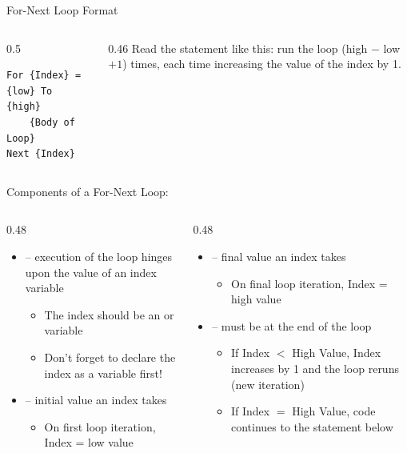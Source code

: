 \documentclass{beamer}
\begin{document}
{%
\begin{frame}[fragile]{For-Next Loop Format}
\begin{columns}[c]
\begin{column}{0.5\textwidth}
\begin{lstlisting}[language=VBA]
For {Index} = {low} To {high}
    {Body of Loop}
Next {Index}
\end{lstlisting}
\end{column}
\begin{column}{0.46\textwidth}
\small Read the statement like this: run the loop (high $-$ low $+ 1$) times, each time
increasing the value of the index by 1.
\end{column}
\end{columns}
\vspace{0.2em}
\scriptsize
Components of a For-Next Loop:
\begin{columns}[T]
\begin{column}{0.48\textwidth}
\begin{itemize}
  \item {} -- execution of the loop hinges upon the value of an index variable
  \begin{itemize}
    \item The index should be an  or  variable
    \item Don't forget to declare the index as a variable first!
  \end{itemize}
  \item {} -- initial value an index takes
  \begin{itemize}\item On first loop iteration, Index = low value\end{itemize}
\end{itemize}
\end{column}
\begin{column}{0.48\textwidth}
\begin{itemize}
  \item {} -- final value an index takes
  \begin{itemize}\item On final loop iteration, Index = high value\end{itemize}
  \item {} -- must be at the end of the loop
  \begin{itemize}
    \item If Index $<$ High Value, Index increases by 1 and the loop reruns (new iteration)
    \item If Index $=$ High Value, code continues to the statement below 
  \end{itemize}
\end{itemize}
\end{column}
\end{columns}
\end{frame}
}
\end{document}
